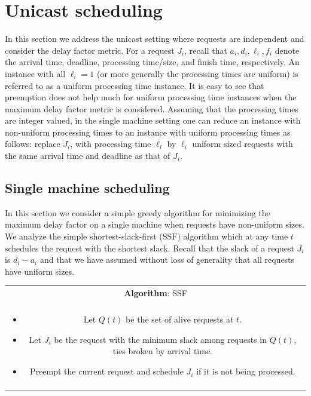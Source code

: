 \documentclass[10pt]{article}
\theoremstyle{definition}
\numberwithin{equation}{section}
\newcommand{\Algorithm}[1]{{\textrm{#1}}} %
\newcommand{\sug}{\Algorithm{SSF}} %
\begin{document}
\section{Unicast scheduling}
\label{sec:unicast} In this section we address the unicast setting
where requests are independent and consider the delay factor metric.
For a request $J_i$, recall that $a_i,d_i,\ell_i,f_i$ denote the
arrival time, deadline, processing time/size, and finish time,
respectively. An instance with all $\ell_i = 1$ (or more generally
the processing times are uniform) is referred to as a uniform
processing time instance. It is easy to see that preemption does not
help much for uniform processing time instances when the maximum
delay factor metric is considered. Assuming that the processing
times are integer valued, in the single machine setting one can
reduce an instance with non-uniform processing times to an instance
with uniform processing times as follows:  replace $J_i$, with
processing time $\ell_i$ by $\ell_i$ uniform sized requests with
the same arrival time and deadline as that of $J_i$.
\setcounter{subsection}{0}\setcounter{theorem}{2}
\subsection{Single machine scheduling}
\label{unicast-single}

In this section we consider a simple greedy algorithm for minimizing
the maximum delay factor on a single machine when requests have
non-uniform sizes.  We analyze the simple shortest-slack-first
($\sug$) algorithm which at any time $t$ schedules the request with
the shortest slack.  Recall that the slack of a request $J_i$ is $d_i
- a_i$ and that we have assumed without loss of generality that all
requests have uniform sizes.

\begin{center}
\begin{tabular}[r]{|c|}
\hline
\textbf{Algorithm}: \sug \\

\\

\begin{minipage}{13cm}
\begin{itemize}
\item Let $Q(t)$ be the set of alive requests at $t$.
\item Let $J_i$ be the request with the minimum slack among requests
  in $Q(t)$, ties broken by arrival time.
\item Preempt the current request
  and schedule $J_i$ if it is not being processed.






\end{itemize}
\end{minipage}\\\\

\hline
\end{tabular}
\end{center}
\end{document}
